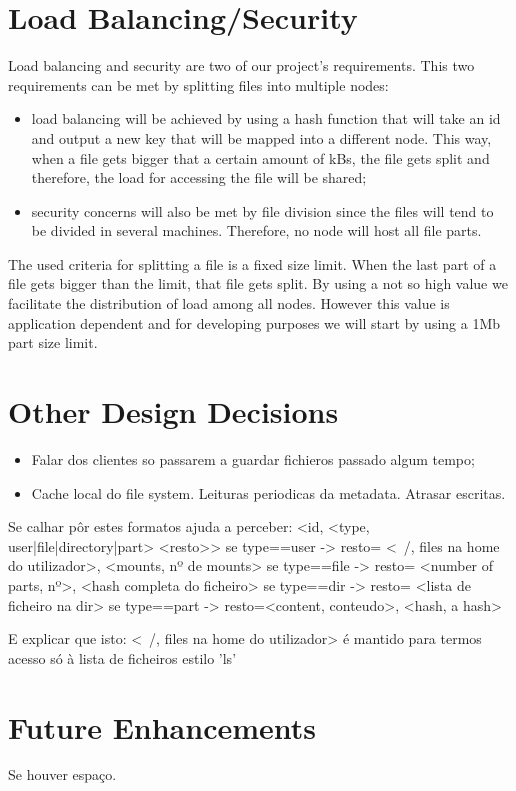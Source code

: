 \documentclass[times,9pt,article]{llncs}
\begin{document}
\section{Load Balancing/Security}

Load balancing and security are two of our project's requirements. This two 
requirements can be met by splitting files into multiple nodes:
\begin{itemize}
\item load balancing will be achieved by using a hash function that will take
an id and output a new key that will be mapped into a different node. This way,
when a file gets bigger that a certain amount of kBs, the file gets split and
therefore, the load for accessing the file will be shared;
\item security concerns will also be met by file division since the files will
tend to be divided in several machines. Therefore, no node will host all file
parts.
\end{itemize} 

The used criteria for splitting a file is a fixed size limit. When the last part
of a file gets bigger than the limit, that file gets split. By using a not so high
value we facilitate the distribution of load among all nodes. However this value
is application dependent and for developing purposes we will start by using a
1Mb part size limit.   

\section{Other Design Decisions}
\begin{itemize}
\item Falar dos clientes so passarem a guardar fichieros passado algum tempo;
\item Cache local do file system. Leituras periodicas da metadata. Atrasar escritas.
\end{itemize}

Se calhar pôr estes formatos ajuda a perceber:
<id, <type, user|file|directory|part> <resto>>
se type==user -> resto= <~/, files na home do utilizador>, <mounts, nº de mounts>
se type==file -> resto= <number of parts, nº>, <hash completa do ficheiro>
se type==dir -> resto= <lista de ficheiro na dir>
se type==part -> resto=<content, conteudo>, <hash, a hash>

E explicar que isto: <~/, files na home do utilizador> é mantido para termos acesso só 
à lista de ficheiros estilo 'ls'

\section{Future Enhancements}
Se houver espaço.
\end{document}
